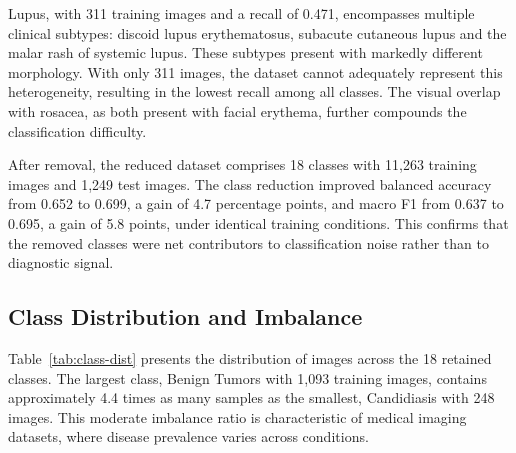 \documentclass[11pt,a4paper]{article}
\begin{document}
Lupus, with 311 training images and a recall of 0.471, encompasses multiple clinical subtypes: discoid lupus erythematosus, subacute cutaneous lupus and the malar rash of systemic lupus. These subtypes present with markedly different morphology. With only 311 images, the dataset cannot adequately represent this heterogeneity, resulting in the lowest recall among all classes. The visual overlap with rosacea, as both present with facial erythema, further compounds the classification difficulty.

\medskip

After removal, the reduced dataset comprises 18 classes with 11,263 training images and 1,249 test images. The class reduction improved balanced accuracy from 0.652 to 0.699, a gain of 4.7 percentage points, and macro F1 from 0.637 to 0.695, a gain of 5.8 points, under identical training conditions. This confirms that the removed classes were net contributors to classification noise rather than to diagnostic signal.

\subsection{Class Distribution and Imbalance}

Table~\ref{tab:class-dist} presents the distribution of images across the 18 retained classes. The largest class, Benign Tumors with 1,093 training images, contains approximately 4.4 times as many samples as the smallest, Candidiasis with 248 images. This moderate imbalance ratio is characteristic of medical imaging datasets, where disease prevalence varies across conditions.
\end{document}

